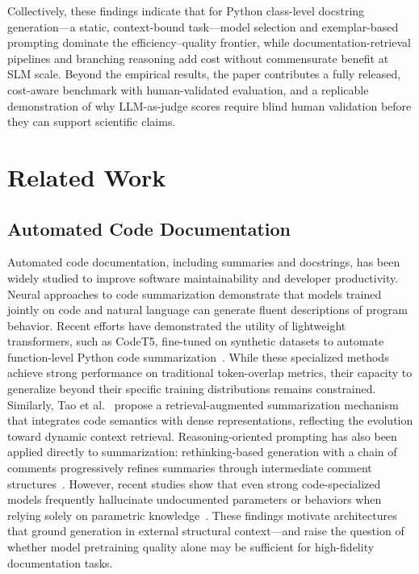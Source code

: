 \documentclass[pdflatex,sn-mathphys-ay]{sn-jnl}%
\theoremstyle{thmstyleone}%
\theoremstyle{thmstyletwo}%
\theoremstyle{thmstylethree}%
\begin{document}
Collectively, these findings indicate that for Python class-level docstring generation---a static, context-bound task---model selection and exemplar-based prompting dominate the efficiency--quality frontier, while documentation-retrieval pipelines and branching reasoning add cost without commensurate benefit at SLM scale. Beyond the empirical results, the paper contributes a fully released, cost-aware benchmark with human-validated evaluation, and a replicable demonstration of why LLM-as-judge scores require blind human validation before they can support scientific claims.

\section{Related Work}
\label{sec:related}

\subsection{Automated Code Documentation}
Automated code documentation, including summaries and docstrings, has been widely studied to improve software maintainability and developer productivity. Neural approaches to code summarization demonstrate that models trained jointly on code and natural language can generate fluent descriptions of program behavior. Recent efforts have demonstrated the utility of lightweight transformers, such as CodeT5, fine-tuned on synthetic datasets to automate function-level Python code summarization~\cite{Kharidu2025AutomatedFL}. While these specialized methods achieve strong performance on traditional token-overlap metrics, their capacity to generalize beyond their specific training distributions remains constrained. Similarly, Tao et al.~\cite{Tao2025RetrievalAugmentedCG} propose a retrieval-augmented summarization mechanism that integrates code semantics with dense representations, reflecting the evolution toward dynamic context retrieval. Reasoning-oriented prompting has also been applied directly to summarization: rethinking-based generation with a chain of comments progressively refines summaries through intermediate comment structures~\cite{chainofcomments2025}.
However, recent studies show that even strong code-specialized models frequently hallucinate undocumented parameters or behaviors when relying solely on parametric knowledge~\cite{CanDR,gireesh}. These findings motivate architectures that ground generation in external structural context---and raise the question of whether model pretraining quality alone may be sufficient for high-fidelity documentation tasks.
\end{document}
